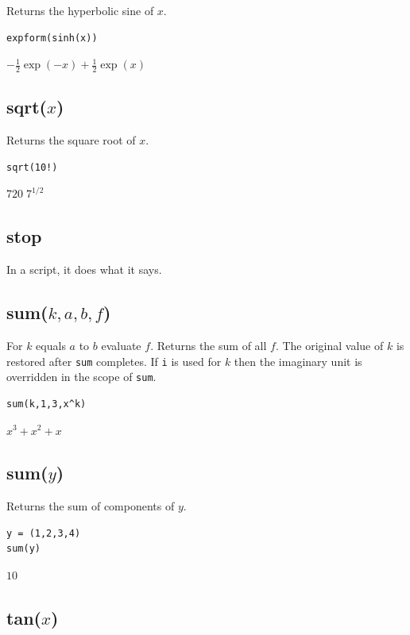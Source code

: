 \documentclass[12pt]{article}
\begin{document}
Returns the hyperbolic sine of $x$.

{\color{blue}
\begin{verbatim}
expform(sinh(x))
\end{verbatim}
}

$\displaystyle -\tfrac{1}{2}\exp(-x)+\tfrac{1}{2}\exp(x)$

\subsection*{sqrt($x$)}

Returns the square root of $x$.

{\color{blue}
\begin{verbatim}
sqrt(10!)
\end{verbatim}
}

$\displaystyle 720\; 7^{1/2}$

\subsection*{stop}

In a script, it does what it says.

\subsection*{sum($k,a,b,f$)}

For $k$ equals $a$ to $b$ evaluate $f$.
Returns the sum of all $f$.
The original value of $k$ is restored after \verb$sum$ completes.
If \verb$i$ is used for $k$ then the imaginary unit is overridden in the scope of \verb$sum$.

{\color{blue}
\begin{verbatim}
sum(k,1,3,x^k)
\end{verbatim}
}

$x^3+x^2+x$

\subsection*{sum($y$)}

Returns the sum of components of $y$.

{\color{blue}
\begin{verbatim}
y = (1,2,3,4)
sum(y)
\end{verbatim}
}

$10$

\subsection*{tan($x$)}
\end{document}
